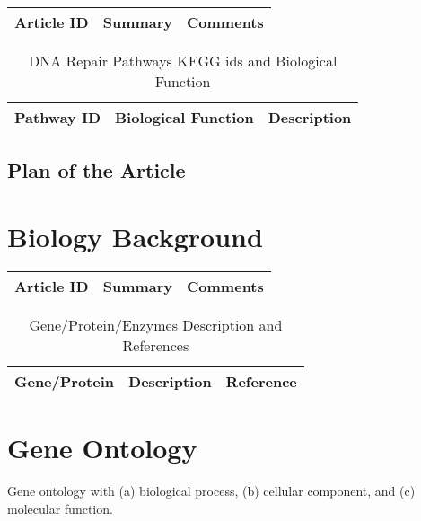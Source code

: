 \begin{table}[H]\centering
	\begin{tabular}{p{1cm}p{4cm}p{3cm}}
		Article ID & Summary & Comments\\
		\hline
		\hline
	\end{tabular}
\end{table}

\begin{table}[H]
\caption{DNA Repair Pathways KEGG ids and Biological Function}
\tiny
\begin{tabular}{rp{3.5cm}p{1cm}}
\hline
Pathway ID  & Biological Function & Description  \\
\hline
\hline
\end{tabular}
\end{table}

\subsection{Plan of the Article}

\begin{enumerate}
\end{enumerate}

\section{Biology Background}

\begin{table}[H]\centering
	\begin{tabular}{p{1cm}p{4cm}p{3cm}}
		Article ID & Summary & Comments\\
		\hline
		\hline
	\end{tabular}
\end{table}

\begin{table}[H]\tiny
\caption{Gene/Protein/Enzymes Description and References}	
\begin{tabular}{r|p{6cm}|l}
\hline	
Gene/Protein & Description & Reference \\
\hline
\hline 
\end{tabular}
\end{table}
\vspace{4pt}

\section{Gene Ontology}

Gene ontology with (a) biological process, (b) cellular component, and (c) molecular function. 

